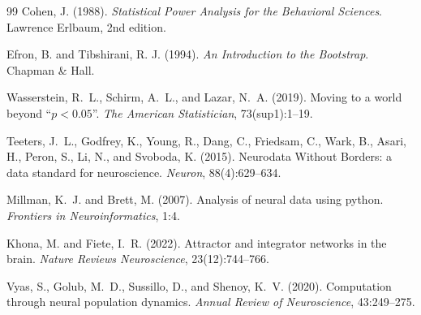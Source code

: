 \documentclass[10pt,onecolumn]{article}
\begin{document}
\begin{thebibliography}{99}
Cohen, J. (1988).
\newblock \textit{Statistical Power Analysis for the Behavioral Sciences}.
\newblock Lawrence Erlbaum, 2nd edition.

Efron, B. and Tibshirani, R. J. (1994).
\newblock \textit{An Introduction to the Bootstrap}.
\newblock Chapman \& Hall.

Wasserstein, R.~L., Schirm, A.~L., and Lazar, N.~A. (2019).
\newblock Moving to a world beyond “\(p<0.05\)”.
\newblock \textit{The American Statistician}, 73(sup1):1--19.

Teeters, J.~L., Godfrey, K., Young, R., Dang, C., Friedsam, C., Wark, B., Asari, H., Peron, S., Li, N., and Svoboda, K. (2015).
\newblock Neurodata Without Borders: a data standard for neuroscience.
\newblock \textit{Neuron}, 88(4):629--634.

Millman, K.~J. and Brett, M. (2007).
\newblock Analysis of neural data using python.
\newblock \textit{Frontiers in Neuroinformatics}, 1:4.

Khona, M. and Fiete, I.~R. (2022).
\newblock Attractor and integrator networks in the brain.
\newblock \textit{Nature Reviews Neuroscience}, 23(12):744--766.

Vyas, S., Golub, M.~D., Sussillo, D., and Shenoy, K.~V. (2020).
\newblock Computation through neural population dynamics.
\newblock \textit{Annual Review of Neuroscience}, 43:249--275.

\end{thebibliography}
\end{document}
